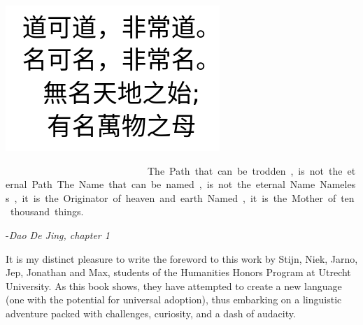 \begin{center}{\it

	\includegraphics[scale=0.5]{./Images/Chinese.jpeg}
	\vspace{0.8cm} 

	\renewcommand{\corpsgrootte}{15pt}
\lol\pe\Atlanpi\tom\comma \Atlanne\si \lol\tet

\na\pe\Atlanpi\na\comma \Atlanne\si \na\tet 

\si\Atlanne\Atlanpi\na\comma \si \mi \ta\som\an\tem 

\si\Atlanpi\na\comma \si \Atlanfi\pet \ta\on\mus 
\restorecorps

	\vspace{0.8cm} 

The Path that can be trodden, 

is not the eternal Path. 

The Name that can be named, 

is not the eternal Name. 

Nameless, it is the Originator  

of heaven and earth 

Named, it is the Mother  

of ten thousand things. 
}


\vspace{0.3cm}


-{\it Dao De Jing, chapter 1}

\end{center}


\pagebreak


\noindent It is my distinct pleasure to write the foreword to this work by Stijn, Niek, Jarno, Jep, Jonathan and Max, students of the Humanities Honors Program at Utrecht University. As this book shows, they have attempted to create a new language (one with the potential for universal adoption), thus embarking on a linguistic adventure packed with challenges, curiosity, and a dash of audacity.  

